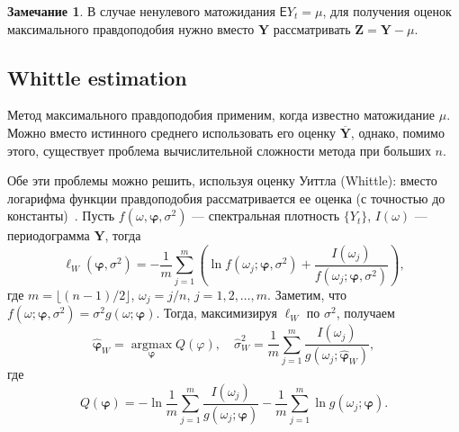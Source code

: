 \documentclass[specialist,
substylefile = spbu_report.rtx,
subf,href,colorlinks=true, 12pt]{disser}
\theoremstyle{definition}
\newtheorem{remark}{Замечание}[section]
\begin{document}
\begin{remark}
	В случае ненулевого матожидания $\mathsf{E}Y_t=\mu$, для получения оценок максимального правдоподобия нужно вместо $\bm Y$ рассматривать $\bm Z=\bm Y-\mu$. 
\end{remark}
\subsection{Whittle estimation}
Метод максимального правдоподобия применим, когда известно матожидание $\mu$. Можно вместо истинного среднего использовать его оценку $\overline{\bm Y}$, однако, помимо этого, существует проблема вычислительной сложности метода при больших $n$.

Обе эти проблемы можно решить, используя оценку Уиттла (Whittle): вместо логарифма функции правдоподобия рассматривается ее оценка (с точностью до константы)~\cite{Whittle1953}. Пусть $f(\omega, \bm\varphi, \sigma^2)$ --- спектральная плотность $\{Y_t\}$, $I(\omega)$ --- периодограмма $\bm Y$, тогда
\[
	\ell_W(\bm\varphi, \sigma^2)=-\frac1m\sum_{j=1}^m\left(\ln f(\omega_j; \bm\varphi, \sigma^2) + \frac{I(\omega_j)}{f(\omega_j; \bm\varphi, \sigma^2)}\right),
\]
где $m=\lfloor(n-1)/2\rfloor$, $\omega_j = j / n$, $j=1,2,\ldots,m$. Заметим, что $f(\omega; \bm\varphi, \sigma^2)=\sigma^2 g(\omega; \bm\varphi)$. Тогда, максимизируя $\ell_W$ по $\sigma^2$, получаем
\[
\widehat{\bm\varphi}_W = \operatorname*{argmax}_{\bm\varphi}Q(\varphi),\quad \widehat\sigma_W^2=\frac1m \sum_{j=1}^m\frac{I(\omega_j)}{g(\omega_j; \widehat{\bm\varphi}_W)},
\]
где
\[
	Q(\bm\varphi)=-\ln\frac1m \sum_{j=1}^m\frac{I(\omega_j)}{g(\omega_j; \bm\varphi)} - \frac1m \sum_{j=1}^m\ln g(\omega_j; \bm\varphi).
\]



\end{document}
